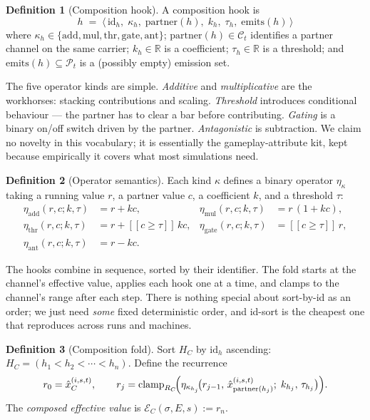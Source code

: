 \documentclass[journal,onecolumn,11pt]{IEEEtran}
\theoremstyle{definition}
\newtheorem{definition}{Definition}
\begin{document}
\begin{definition}[Composition hook]
A composition hook is
\[
h \;=\; \langle\, \mathrm{id}_h,\; \kappa_h,\; \mathrm{partner}(h),\; k_h,\; \tau_h,\; \mathrm{emits}(h) \,\rangle
\]
where $\kappa_h \in \{\mathrm{add},\mathrm{mul},\mathrm{thr},\mathrm{gate},\mathrm{ant}\}$; $\mathrm{partner}(h) \in \mathcal{C}_t$ identifies a partner channel on the same carrier; $k_h \in \mathbb{R}$ is a coefficient; $\tau_h \in \mathbb{R}$ is a threshold; and $\mathrm{emits}(h) \subseteq \mathcal{P}_t$ is a (possibly empty) emission set.
\end{definition}

The five operator kinds are simple. \emph{Additive} and \emph{multiplicative} are the workhorses: stacking contributions and scaling. \emph{Threshold} introduces conditional behaviour --- the partner has to clear a bar before contributing. \emph{Gating} is a binary on/off switch driven by the partner. \emph{Antagonistic} is subtraction. We claim no novelty in this vocabulary; it is essentially the gameplay-attribute kit, kept because empirically it covers what most simulations need.

\begin{definition}[Operator semantics]\label{def:opsem}
Each kind $\kappa$ defines a binary operator $\eta_\kappa$ taking a running value $r$, a partner value $c$, a coefficient $k$, and a threshold $\tau$:
\begin{align*}
\eta_{\mathrm{add}}(r,c;k,\tau) &= r + kc, &
\eta_{\mathrm{mul}}(r,c;k,\tau) &= r\,(1+kc), \\
\eta_{\mathrm{thr}}(r,c;k,\tau) &= r + [\![c \ge \tau]\!]\, kc, &
\eta_{\mathrm{gate}}(r,c;k,\tau) &= [\![c \ge \tau]\!]\, r, \\
\eta_{\mathrm{ant}}(r,c;k,\tau) &= r - kc.
\end{align*}
\end{definition}

The hooks combine in sequence, sorted by their identifier. The fold starts at the channel's effective value, applies each hook one at a time, and clamps to the channel's range after each step. There is nothing special about sort-by-id as an order; we just need \emph{some} fixed deterministic order, and id-sort is the cheapest one that reproduces across runs and machines.

\begin{definition}[Composition fold]
Sort $H_C$ by $\mathrm{id}_h$ ascending: $H_C = (h_1 < h_2 < \cdots < h_n)$. Define the recurrence
\[
r_0 = \hat{x}_C^{(i,s,t)}, \qquad
r_j = \mathrm{clamp}_{R_C}\!\Bigl(\eta_{\kappa_{h_j}}\!\bigl(r_{j-1},\, \hat{x}_{\mathrm{partner}(h_j)}^{(i,s,t)};\; k_{h_j},\, \tau_{h_j}\bigr)\Bigr).
\]
The \emph{composed effective value} is $\mathcal{E}_C(\sigma,E,s) := r_n$.
\end{definition}
\end{document}
